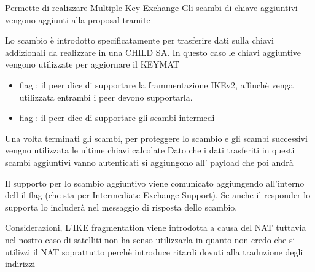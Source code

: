 Permette di realizzare Multiple Key Exchange
Gli scambi di chiave aggiuntivi vengono aggiunti alla proposal tramite 



Lo scambio  è introdotto specificatamente per trasferire dati sulla chiavi addizionali da realizzare in una CHILD SA.
In questo caso le chiavi aggiuntive vengono utilizzate per aggiornare il KEYMAT



\begin{itemize}
    \item flag : il peer dice di supportare la frammentazione IKEv2, affinchè venga utilizzata entrambi i peer devono supportarla.
    \item flag : il peer dice di supportare gli scambi intermedi
\end{itemize}

Una volta terminati gli scambi, per proteggere lo scambio  e gli scambi successivi vengno utilizzata le ultime chiavi calcolate
Dato che i dati trasferiti in questi scambi aggiuntivi vanno autenticati si aggiungono all' payload che poi andrà 



Il supporto per lo scambio aggiuntivo viene comunicato aggiungendo all'interno
dell  il flag  (che sta per
Intermediate Exchange Support).
Se anche il responder lo supporta lo includerà nel messaggio di risposta dello
scambio.




Considerazioni, L'IKE fragmentation viene introdotta a causa del NAT tuttavia nel nostro caso di satelliti non ha senso utilizzarla in quanto non credo che si utilizzi
il NAT soprattutto perchè introduce ritardi dovuti alla traduzione degli indirizzi


